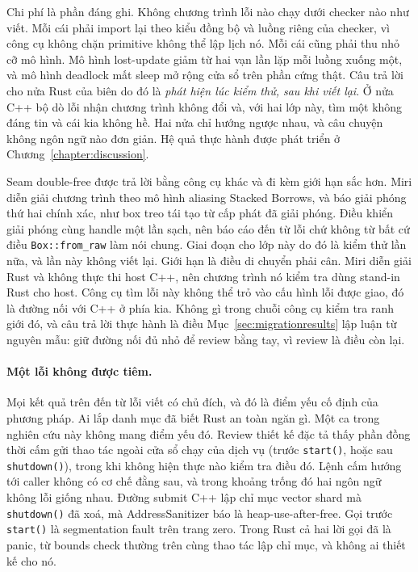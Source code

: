 Chi phí là phần đáng ghi. Không chương trình lỗi nào chạy dưới checker nào như
viết. Mỗi cái phải import lại theo kiểu đồng bộ và luồng riêng của checker,
vì công cụ không chặn primitive không thể lập lịch nó. Mỗi cái cũng phải
thu nhỏ cỡ mô hình. Mô hình lost-update giảm từ hai vạn lần lặp mỗi luồng xuống
một, và mô hình deadlock mất sleep mở rộng cửa sổ trên phần cứng thật. Câu trả lời cho nửa Rust của biên do đó là \emph{phát hiện lúc kiểm thử, sau khi viết lại}.
Ở nửa C++ bộ dò lỗi nhận chương trình không đổi và, với hai lớp này,
tìm một không đáng tin và cái kia không hề. Hai nửa chỉ hướng ngược nhau, và
câu chuyện không ngôn ngữ nào đơn giản. Hệ quả thực hành được phát triển ở
Chương~\ref{chapter:discussion}.

Seam double-free được trả lời bằng công cụ khác và đi kèm giới hạn sắc hơn. Miri
diễn giải chương trình theo mô hình aliasing Stacked Borrows, và báo giải phóng
thứ hai chính xác, như box treo tái tạo từ cấp phát đã giải phóng. Điều khiển
giải phóng cùng handle một lần sạch, nên báo cáo đến từ lỗi chứ không từ
bất cứ điều \texttt{Box::from\_raw} làm nói chung. Giai đoạn cho lớp này do đó là kiểm thử
lần nữa, và lần này không viết lại. Giới hạn là điều di chuyển phải cân. Miri
diễn giải Rust và không thực thi host C++, nên chương trình nó kiểm tra dùng stand-in Rust cho
host. Công cụ tìm lỗi này không thể trỏ vào cấu hình lỗi
được giao, đó là đường nối với C++ ở phía kia. Không gì trong chuỗi công cụ kiểm tra
ranh giới đó, và câu trả lời thực hành là điều
Mục~\ref{sec:migrationresults} lập luận từ nguyên mẫu: giữ đường nối đủ nhỏ để
review bằng tay, vì review là điều còn lại.

\paragraph{Một lỗi không được tiêm.}
Mọi kết quả trên đến từ lỗi viết có chủ đích, và đó là điểm yếu cố định của
phương pháp. Ai lắp danh mục đã biết Rust an toàn ngăn gì. Một ca trong
nghiên cứu này không mang điểm yếu đó. Review thiết kế đặc tả thấy phần
đồng thời cấm gửi thao tác ngoài cửa sổ chạy của dịch vụ
(trước \texttt{start()}, hoặc sau \texttt{shutdown()}), trong khi không hiện thực nào kiểm tra
điều đó. Lệnh cấm hướng tới caller không có cơ chế đằng sau, và trong khoảng trống đó
hai ngôn ngữ không lỗi giống nhau. Đường submit C++ lập chỉ mục vector shard mà
\texttt{shutdown()} đã xoá, mà AddressSanitizer báo là heap-use-after-free. Gọi
trước \texttt{start()} là segmentation fault trên trang zero. Trong Rust cả hai lời gọi đã
là panic, từ bounds check thường trên cùng thao tác lập chỉ mục, và không ai
thiết kế cho nó.

